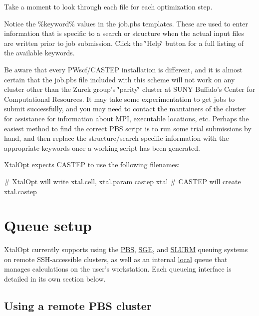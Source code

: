 Take a moment to look through each file for each optimization step.

Notice the \%keyword\% values in the job.\-pbs templates. These are used to enter information that is specific to a search or structure when the actual input files are written prior to job submission. Click the \char`\"{}\-Help\char`\"{} button for a full listing of the available keywords.

Be aware that every P\-Wscf/\-C\-A\-S\-T\-E\-P installation is different, and it is almost certain that the job.\-pbs file included with this scheme will not work on any cluster other than the Zurek group's \char`\"{}parity\char`\"{} cluster at S\-U\-N\-Y Buffalo's Center for Computational Resources. It may take some experimentation to get jobs to submit successfully, and you may need to contact the mantainers of the cluster for assistance for information about M\-P\-I, executable locations, etc. Perhaps the easiest method to find the correct P\-B\-S script is to run some trial submissions by hand, and then replace the structure/search specific information with the appropriate keywords once a working script has been generated.

Xtal\-Opt expects C\-A\-S\-T\-E\-P to use the following filenames\-:


\begin{DoxyCode}
\textcolor{preprocessor}{# XtalOpt will write xtal.cell, xtal.param}
\textcolor{preprocessor}{}castep xtal
\textcolor{preprocessor}{# CASTEP will create xtal.castep}
\end{DoxyCode}
\hypertarget{tut-xo_qisetup}{}\section{Queue setup}\label{tut-xo_qisetup}
Xtal\-Opt currently supports using the \hyperlink{tut-xo_remotepbs}{P\-B\-S}, \hyperlink{tut-xo_remotesge}{S\-G\-E}, and \hyperlink{tut-xo_remoteslurm}{S\-L\-U\-R\-M} queuing systems on remote S\-S\-H-\/accessible clusters, as well as an internal \hyperlink{tut-xo_localqi}{local} queue that manages calculations on the user's workstation. Each queueing interface is detailed in its own section below.\hypertarget{tut-xo_remotepbs}{}\subsection{Using a remote P\-B\-S cluster}\label{tut-xo_remotepbs}
 
